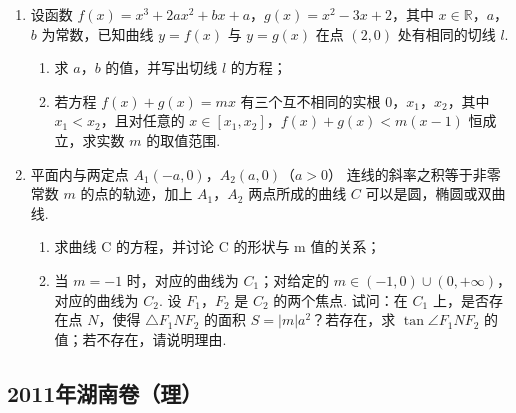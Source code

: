 \begin{description}
\begin{enumerate}[leftmargin=5pt]
        \item 设函数 \( f(x) = x^{3} + 2ax^{2} + bx + a \)，\( g(x) = x^{2} - 3x + 2 \)，其中 \( x \in \mathbb{R} \)，\(a\)，\(b\) 为常数，已知曲线 \( y = f(x) \) 与 \( y = g(x) \) 在点 \((2,0)\) 处有相同的切线 \( l \).
\begin{enumerate}
\item 求 \(a\)，\(b\) 的值，并写出切线 \(l\) 的方程；
\item 若方程 \( f(x) + g(x) = mx \) 有三个互不相同的实根 \(0\)，\(x_1\)，\(x_2\)，其中 \( x_1 < x_2 \)，且对任意的 \( x \in [x_1, x_2] \)，\( f(x) + g(x) < m (x - 1) \) 恒成立，求实数 \( m \) 的取值范围.
\end{enumerate}

        \item 平面内与两定点 \(A_{1}(-a,0)\)，\(A_{2}(a,0) \)（\(a > 0\)） 连线的斜率之积等于非零常数 \(m\) 的点的轨迹，加上 \(A_{1}\)，\(A_{2}\) 两点所成的曲线 \(C\) 可以是圆，椭圆或双曲线.
\begin{enumerate}
\item 求曲线 C 的方程，并讨论 C 的形状与 m 值的关系；
\item 当 \(m = -1\) 时，对应的曲线为 \(C_1\)；对给定的 \(m \in (-1,0) \cup (0,+\infty)\)，对应的曲线为 \(C_2\). 设 \(F_1\)，\(F_2\) 是 \(C_2\) 的两个焦点. 试问：在 \(C_1\) 上，是否存在点 \(N\)，使得 \(\triangle F_1NF_2\) 的面积 \(S = |m|a^2\)？若存在，求 \(\tan \angle F_1NF_2\) 的值；若不存在，请说明理由.
\end{enumerate}

    \end{enumerate}

\end{description}


\subsection{2011年湖南卷（理）}\label{gk:2011年湖南卷（理）}

